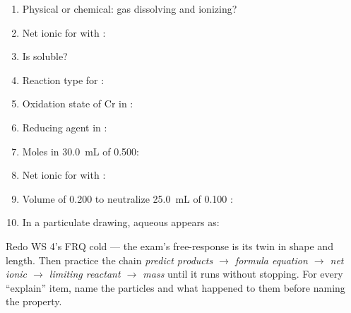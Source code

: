 \documentclass{apchem-worksheet}
\begin{document}
\begin{enumerate}[leftmargin=*,itemsep=0.4em]
  \item Physical or chemical:  gas dissolving and ionizing?
  \item Net ionic for  with :
  \item Is  soluble? 
  \item Reaction type for :
  \item Oxidation state of Cr in :
  \item Reducing agent in :
  \item Moles in \SI{30.0}{\milli\liter} of \SI{0.500}{\Molar}:
  \item Net ionic for  with :
  \item Volume of \SI{0.200}{\Molar}  to neutralize
        \SI{25.0}{\milli\liter} of \SI{0.100}{\Molar} :
  \item In a particulate drawing, aqueous  appears as:
\end{enumerate}

\begin{apcnote}
Redo WS 4's FRQ cold --- the exam's free-response is its twin in shape and
length. Then practice the chain \emph{predict products $\to$ formula
equation $\to$ net ionic $\to$ limiting reactant $\to$ mass} until it runs
without stopping. For every ``explain'' item, name the particles and what
happened to them before naming the property.
\end{apcnote}
\end{document}
